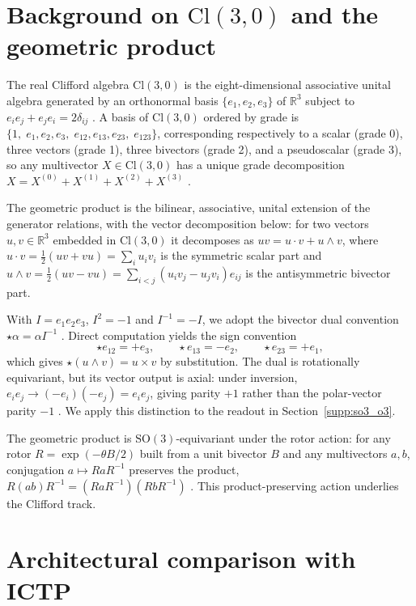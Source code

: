\section{Background on \texorpdfstring{$\mathrm{Cl}(3,0)$}{Cl(3,0)} and the geometric product}\label{supp:prelim}

The real Clifford algebra $\mathrm{Cl}(3,0)$ is the eight-dimensional associative unital algebra generated by an orthonormal basis $\{e_1, e_2, e_3\}$ of $\mathbb{R}^3$ subject to $e_ie_j + e_je_i = 2\delta_{ij}$ \citep{lounesto2001clifford}. A basis of $\mathrm{Cl}(3,0)$ ordered by grade is $\{1,\; e_1, e_2, e_3,\; e_{12}, e_{13}, e_{23},\; e_{123}\}$, corresponding respectively to a scalar (grade 0), three vectors (grade 1), three bivectors (grade 2), and a pseudoscalar (grade 3), so any multivector $X \in \mathrm{Cl}(3,0)$ has a unique grade decomposition $X = X^{(0)} + X^{(1)} + X^{(2)} + X^{(3)}$ \citep{ruhe2023gcan}.

The geometric product is the bilinear, associative, unital extension of the generator relations, with the vector decomposition \citep{brandstetter2022clifford} below: for two vectors $u, v \in \mathbb{R}^3$ embedded in $\mathrm{Cl}(3,0)$ it decomposes as $uv = u \cdot v + u \wedge v$, where $u \cdot v = \tfrac{1}{2}(uv + vu) = \sum_i u_iv_i$ is the symmetric scalar part and $u \wedge v = \tfrac{1}{2}(uv - vu) = \sum_{i<j}(u_iv_j - u_jv_i)e_{ij}$ is the antisymmetric bivector part.

With $I=e_1e_2e_3$, $I^2=-1$ and $I^{-1}=-I$, we adopt the bivector dual convention $\star\alpha=\alpha I^{-1}$ \citep{doran2003geometric}. Direct computation yields the sign convention
\[
\star e_{12} = +e_3,\qquad \star e_{13} = -e_2,\qquad \star e_{23} = +e_1,
\]
which gives $\star(u\wedge v)=u\times v$ by substitution. The dual is rotationally equivariant, but its vector output is axial: under inversion, $e_ie_j \to (-e_i)(-e_j)=e_ie_j$, giving parity $+1$ rather than the polar-vector parity $-1$ \citep{geiger2022e3nn}. We apply this distinction to the readout in Section~\ref{supp:so3_o3}.

The geometric product is $\mathrm{SO}(3)$-equivariant under the rotor action: for any rotor $R = \exp(-\theta B/2)$ built from a unit bivector $B$ and any multivectors $a, b$, conjugation $a \mapsto RaR^{-1}$ preserves the product, $R(ab)R^{-1} = (RaR^{-1})(RbR^{-1})$ \citep{ruhe2023cgenn}. This product-preserving action underlies the Clifford track.

\section{Architectural comparison with ICTP}\label{supp:ictp}

